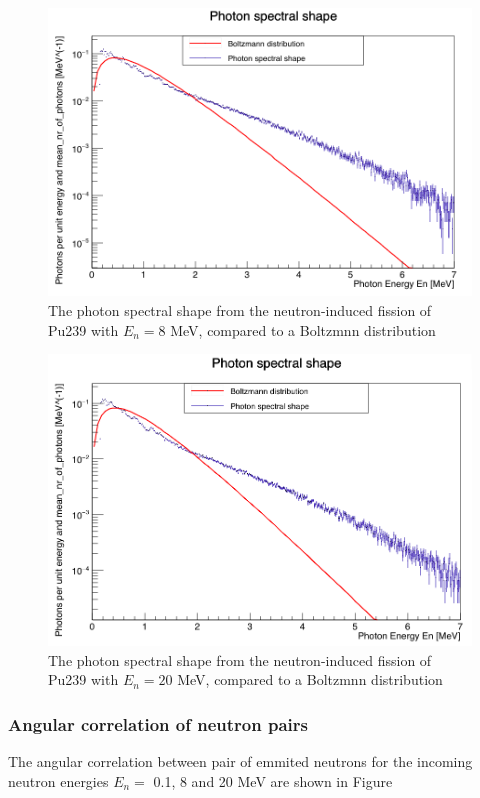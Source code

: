 \documentclass[]{article}
\begin{document}
\begin{figure} [H]
	\centering
	\includegraphics[scale=0.36]{Pu239_8_ph_spectral_shape.png}
	\caption{The photon spectral shape from the neutron-induced fission of Pu239 with $E_n = 8$ MeV, compared to a Boltzmnn distribution}
	\label{fig:Pu239_8_ph_spectral_shape}
\end{figure}

\begin{figure} [H]
	\centering
	\includegraphics[scale=0.36]{Pu239_20_ph_spectral_shape.png}
	\caption{The photon spectral shape from the neutron-induced fission of Pu239 with $E_n = 20$ MeV, compared to a Boltzmnn distribution}
	\label{fig:Pu239_20_ph_spectral_shape}
\end{figure}

\subsubsection{Angular correlation of neutron pairs}
The angular correlation between pair of emmited neutrons for the incoming neutron energies $E_n =$ 0.1, 8 and 20 MeV are shown in Figure
\end{document}
